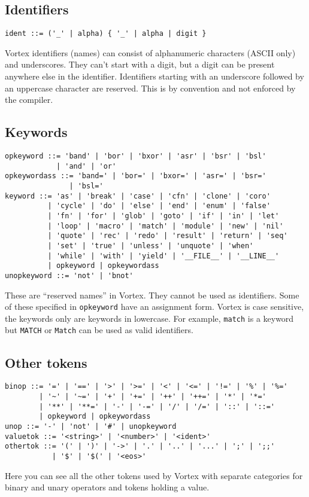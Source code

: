 \documentclass{article}
\begin{document}
\subsection{Identifiers}
\begin{lstlisting}[language=bnf]
ident ::= ('_' | alpha) { '_' | alpha | digit }
\end{lstlisting}
Vortex identifiers (names) can consist of alphanumeric characters (ASCII only) and underscores. They can't start with a digit, but a digit can be present anywhere else in the identifier. Identifiers starting with an underscore followed by an uppercase character are reserved. This is by convention and not enforced by the compiler.
\subsection{Keywords}
\begin{lstlisting}[language=bnf]
opkeyword ::= 'band' | 'bor' | 'bxor' | 'asr' | 'bsr' | 'bsl'
            | 'and' | 'or'
opkeywordass ::= 'band=' | 'bor=' | 'bxor=' | 'asr=' | 'bsr='
               | 'bsl='
keyword ::= 'as' | 'break' | 'case' | 'cfn' | 'clone' | 'coro'
          | 'cycle' | 'do' | 'else' | 'end' | 'enum' | 'false'
          | 'fn' | 'for' | 'glob' | 'goto' | 'if' | 'in' | 'let'
          | 'loop' | 'macro' | 'match' | 'module' | 'new' | 'nil'
          | 'quote' | 'rec' | 'redo' | 'result' | 'return' | 'seq'
          | 'set' | 'true' | 'unless' | 'unquote' | 'when'
          | 'while' | 'with' | 'yield' | '__FILE__' | '__LINE__'
          | opkeyword | opkeywordass
unopkeyword ::= 'not' | 'bnot'
\end{lstlisting}
These are \enquote{reserved names} in Vortex. They cannot be used as identifiers. Some of these specified in \verb|opkeyword| have an assignment form. Vortex is case sensitive, the keywords only are keywords in lowercase. For example, \verb|match| is a keyword but \verb|MATCH| or \verb|Match| can be used as valid identifiers.
\subsection{Other tokens}
\begin{lstlisting}[language=bnf]
binop ::= '=' | '==' | '>' | '>=' | '<' | '<=' | '!=' | '%' | '%='
        | '~' | '~=' | '+' | '+=' | '++' | '++=' | '*' | '*='
        | '**' | '**=' | '-' | '-=' | '/' | '/=' | '::' | '::='
        | opkeyword | opkeywordass
unop ::= '-' | 'not' | '#' | unopkeyword
valuetok ::= '<string>' | '<number>' | '<ident>'
othertok ::= '(' | ')' | '->' | '.' | '..' | '...' | ';' | ';;'
           | '$' | '$(' | '<eos>'
\end{lstlisting}
Here you can see all the other tokens used by Vortex with separate categories for binary and unary operators and tokens holding a value.
\end{document}
